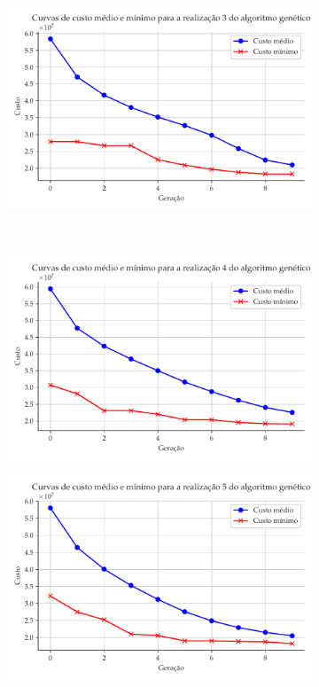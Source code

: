 \documentclass[a4paper, 12pt]{article}
\begin{document}
\begin{figure}[!ht]
\begin{subfigure}{0.4\textwidth}
\end{subfigure}
\begin{subfigure}{0.4\textwidth}
    \includegraphics[width=\textwidth]{figuras/realizacao-3.pdf}
\end{subfigure}
\hfill
\\
\centering
\begin{subfigure}{0.4\textwidth}
    \includegraphics[width=\textwidth]{figuras/realizacao-4.pdf}
\end{subfigure}
\begin{subfigure}{0.4\textwidth}
    \includegraphics[width=\textwidth]{figuras/realizacao-5.pdf}

\end{subfigure}
\end{figure}
\end{document}
